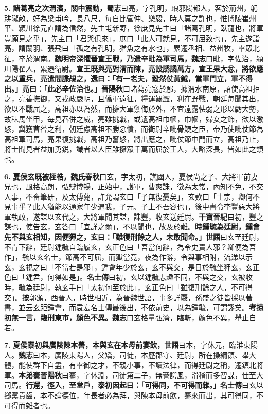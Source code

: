 \textbf{5.} \textbf{諸葛亮之次渭濱，關中震動，}{\footnotesize \textbf{蜀志}曰亮，字孔明，琅邪陽都人，客於荊州，躬耕隴畝，好為梁甫吟，長八尺，毎自比管仲、樂毅，時人莫之許也，惟博陵崔州平、潁川徐元直謂為信然，先主屯新野，徐庶見先主曰「諸葛孔明，臥龍也，將軍豈願見之乎」，先主曰「君與俱來」，庶曰「此人可就見，不可屈致也」，先主遂詣亮，謂關羽、張飛曰「孤之有孔明，猶魚之有水也」，累遷丞相、益州牧，率眾北征，卒於渭南。}\textbf{魏明帝深懼晉宣王戰，乃遣辛毗為軍司馬，}{\footnotesize \textbf{魏志}曰毗，字佐治，潁川陽翟人，累遷衛尉。}\textbf{宣王既與亮對渭而陳，亮設誘譎萬方，宣王果大忿，將欲應之以重兵，亮遣間諜覘之，還曰：「有一老夫，毅然仗黃鉞，當軍門立，軍不得出。」亮曰：「此必辛佐治也。」}{\footnotesize \textbf{晉陽秋}曰諸葛亮寇於郿，據渭水南原，詔使高祖拒之，亮善撫御，又戎政嚴明，且僑軍遠征，糧運艱澀，利在野戰，朝廷毎聞其出，欲以不戰屈之，高祖亦以為然，而擁大軍禦侮於外，不宜遠露怯弱之形以虧大勢，故秣馬坐甲，毎見吞併之威，亮雖挑戰，或遺高祖巾幗，巾幗，婦女之飾，欲以激怒，冀獲曹咎之利，朝廷慮高祖不勝忿憤，而衛尉辛毗骨鯁之臣，帝乃使毗仗節為高祖軍司馬，亮果復挑戰，高祖乃奮怒，將出應之，毗仗節中門而立，高祖乃止，將士聞見者益加勇鋭，識者以人臣雖擁眾千萬而屈於王人，大略深長，皆如此之類也。}

\textbf{6.} \textbf{夏侯玄既被桎梏，}{\footnotesize \textbf{魏氏春秋}曰玄，字太初，譙國人，夏侯尚之子、大將軍前妻兄也，風格高朗，弘辯博暢，正始中，護軍，曹爽誅，徵為太常，內知不免，不交人事，不畜筆研，及太傅薨，許允謂玄曰「子無復憂矣」，玄歎曰「士宗，卿何不見事乎？此人猶能以通家年少遇我，子元、子上不吾容也」，後中書令李豐惡大將軍執政，遂謀以玄代之，大將軍聞其謀，誅豐，收玄送廷尉。\textbf{干寶晉紀}曰初，豐之謀也，使告玄，玄答曰「宜詳之爾」，不以聞也，故及於難。}\textbf{時鍾毓為廷尉，鍾會先不與玄相知，因便狎之，玄曰：「雖復刑餘之人，未敢聞命。」}{\footnotesize \textbf{世語}曰玄至廷尉，不肯下辭，廷尉鍾毓自臨履玄，玄正色曰「吾當何辭，為令史責人邪？卿便為吾作」，毓以玄名士，節高不可屈，而獄當竟，夜為作辭，令與事相附，流涕以示玄，玄視之曰「不當若是邪」，鍾會年少於玄，玄不與交，是日於毓坐狎玄，玄正色曰「鍾君，何得如是」。\textbf{名士傳}曰初，玄以鍾毓志趣不同，不與之交，玄被收時，毓為廷尉，執玄手曰「太初何至於此」，玄正色曰「雖復刑餘之人，不可得交」。\textbf{按}郭頒，西晉人，時世相近，為晉魏世語，事多詳覈，孫盛之徒皆採以著書，並云玄距鍾會，而袁宏名士傳最後出，不依前史，以為鍾毓，可謂謬矣。}\textbf{考掠初無一言，臨刑東市，顏色不異。}{\footnotesize \textbf{魏志}曰玄格量弘濟，臨斬，顏色不異，舉止自若。}

\textbf{7.} \textbf{夏侯泰初與廣陵陳本善，本與玄在本母前宴飲，}{\footnotesize \textbf{世語}曰本，字休元，臨淮東陽人。\textbf{魏志}曰本，廣陵東陽人，父矯，司徒，本歷郡守、廷尉，所在操綱領、舉大體，能使群下自盡，有率御之才，不親小事，不讀法律，而得廷尉之稱，遷鎮北將軍。}\textbf{本弟騫}{\footnotesize \textbf{晉陽秋}曰騫，字休淵，司徒第二子，無謇諤風，滑稽而多智謀，仕至大司馬。}\textbf{行還，徑入，至堂戶，泰初因起曰：「可得同，不可得而雜。」}{\footnotesize \textbf{名士傳}曰玄以鄉黨貴齒，本不論德位，年長者必為拜，與陳本母前飲，騫來而出，其可得同，不可得而雜者也。}

